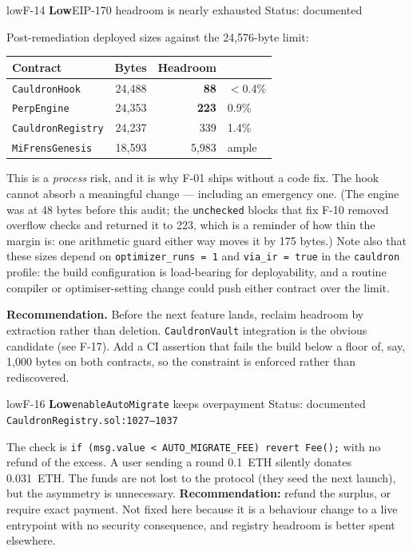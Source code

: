 \documentclass[11pt,a4paper]{article}
\newcommand{\code}[1]{\texttt{\small #1}}
\newcommand{\fileref}[1]{\texttt{\scriptsize #1}}
\begin{document}
\begin{findingbox}{low}{F-14 \quad \textbf{Low}\quad EIP-170 headroom is nearly exhausted \quad Status: documented}
\end{findingbox}
Post-remediation deployed sizes against the 24{,}576-byte limit:
\begin{center}\small
\begin{tabular}{@{}lrrl@{}}
\toprule
\textbf{Contract} & \textbf{Bytes} & \textbf{Headroom} & \\
\midrule
\code{CauldronHook} & 24{,}488 & \textbf{88} & \textcolor{critical}{$<$0.4\%} \\
\code{PerpEngine} & 24{,}353 & \textbf{223} & \textcolor{medium}{0.9\%} \\
\code{CauldronRegistry} & 24{,}237 & 339 & \textcolor{medium}{1.4\%} \\
\code{MiFrensGenesis} & 18{,}593 & 5{,}983 & \textcolor{good}{ample} \\
\bottomrule
\end{tabular}
\end{center}
This is a \emph{process} risk, and it is why F-01 ships without a code fix. The
hook cannot absorb a meaningful change --- including an emergency one. (The engine
was at 48 bytes before this audit; the \code{unchecked} blocks that fix F-10
removed overflow checks and returned it to 223, which is a reminder of how thin the
margin is: one arithmetic guard either way moves it by 175 bytes.) Note also that these sizes depend on
\code{optimizer\_runs = 1} and \code{via\_ir = true} in the \code{cauldron} profile:
the build configuration is load-bearing for deployability, and a routine compiler
or optimiser-setting change could push either contract over the limit.

\textbf{Recommendation.} Before the next feature lands, reclaim headroom by
extraction rather than deletion. \code{CauldronVault} integration is the obvious
candidate (see F-17). Add a CI assertion that fails the build below a floor of,
say, 1{,}000 bytes on both contracts, so the constraint is enforced rather than
rediscovered.

\begin{findingbox}{low}{F-16 \quad \textbf{Low}\quad \code{enableAutoMigrate} keeps overpayment \quad Status: documented}
\fileref{CauldronRegistry.sol:1027--1037}
\end{findingbox}
The check is \code{if (msg.value < AUTO\_MIGRATE\_FEE) revert Fee();} with no
refund of the excess. A user sending a round 0.1~ETH silently donates
0.031~ETH. The funds are not lost to the protocol (they seed the next launch), but
the asymmetry is unnecessary. \textbf{Recommendation:} refund the surplus, or
require exact payment. Not fixed here because it is a behaviour change to a live
entrypoint with no security consequence, and registry headroom is better spent
elsewhere.
\end{document}
